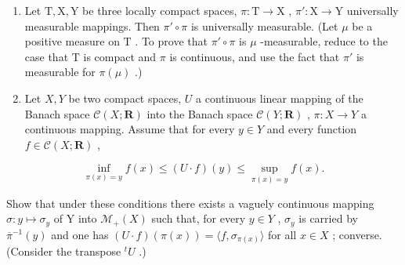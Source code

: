 \begin{enumerate}
\item
  Let \(\mathrm{T},\mathrm{X},\mathrm{Y}\) be three locally compact spaces, \(\pi : \mathrm{T} \to \mathrm{X}\) , \(\pi': \mathrm{X} \to \mathrm{Y}\) universally measurable mappings. Then \(\pi' \circ \pi\) is universally measurable. (Let \(\mu\) be a positive measure on \(\mathrm{T}\) . To prove that \(\pi' \circ \pi\) is \(\mu\) -measurable, reduce to the case that \(\mathrm{T}\) is compact and \(\pi\) is continuous, and use the fact that \(\pi'\) is measurable for \(\pi(\mu)\) .)
\item
  Let \(X, Y\) be two compact spaces, \(U\) a continuous linear mapping of the Banach space \(\mathcal{C}(X; \mathbf{R})\) into the Banach space \(\mathcal{C}(Y; \mathbf{R})\) , \(\pi : X \to Y\) a continuous mapping. Assume that for every \(y \in Y\) and every function \(f \in \mathcal{C}(X; \mathbf{R})\) ,
\end{enumerate}

\[
\inf _ {\pi (x) = y} f (x) \leqslant (U \cdot f) (y) \leqslant \sup _ {\pi (x) = y} f (x).
\]

Show that under these conditions there exists a vaguely continuous mapping \(\sigma: y \mapsto \sigma_y\) of Y into \(\mathcal{M}_+(X)\) such that, for every \(y \in Y\) , \(\sigma_y\) is carried by \(\overline{\pi}^{-1}(y)\) and one has \((U \cdot f)(\pi(x)) = \langle f, \sigma_{\pi(x)} \rangle\) for all \(x \in X\) ; converse. (Consider the transpose \(^t U\) .)

\setcounter{exercisegroup}{7}
\edef\CurrentExerciseGroup{\arabic{exercisegroup}}
